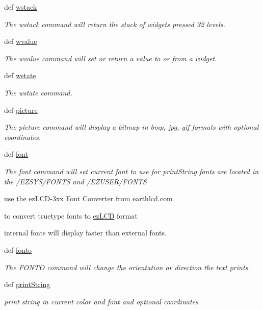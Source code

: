 \begin{DoxyCompactItemize}
def \hyperlink{group___widgets_ga70b40969e280a9c315b84c18848309ca}{wstack}
\begin{DoxyCompactList}\small\item\em The wstack command will return the stack of widgets pressed 32 levels. \end{DoxyCompactList}\item 
def \hyperlink{group___widgets_ga7eaa2fac8abbadf04fa9afb49702906a}{wvalue}
\begin{DoxyCompactList}\small\item\em The wvalue command will set or return a value to or from a widget. \end{DoxyCompactList}\item 
def \hyperlink{group___widgets_gaada0b335d54904b4f4517755ace97e47}{wstate}
\begin{DoxyCompactList}\small\item\em The wstate command. \end{DoxyCompactList}\item 
def \hyperlink{group___bitmap_font_ga3bdde0a3f8505adbfb3c4b7107da7650}{picture}
\begin{DoxyCompactList}\small\item\em The picture command will display a bitmap in bmp, jpg, gif formats with optional coordinates. \end{DoxyCompactList}\item 
def \hyperlink{group___bitmap_font_ga7099c8ffc9b76ad3213d241bb8b8070f}{font}
\begin{DoxyCompactList}\small\item\em The font command will set current font to use for print\-String fonts are located in the /\-E\-Z\-S\-Y\-S/\-F\-O\-N\-T\-S and /\-E\-Z\-U\-S\-E\-R/\-F\-O\-N\-T\-S \par
 use the ez\-L\-C\-D-\/3xx Font Converter from earthlcd.\-com \par
 to convert truetype fonts to \hyperlink{classez_l_c_d3xx_1_1ez_l_c_d}{ez\-L\-C\-D} format \par
 internal fonts will display faster than external fonts. \end{DoxyCompactList}\item 
def \hyperlink{group___bitmap_font_ga445e7a916dbdae456f88bea5fcd88745}{fonto}
\begin{DoxyCompactList}\small\item\em The F\-O\-N\-T\-O command will change the orientation or direction the text prints. \end{DoxyCompactList}\item 
def \hyperlink{group___bitmap_font_gac3a90d479a0423de66988b9850f4852c}{print\-String}
\begin{DoxyCompactList}\small\item\em print string in current color and font and optional coordinates \end{DoxyCompactList}\end{DoxyCompactItemize}
